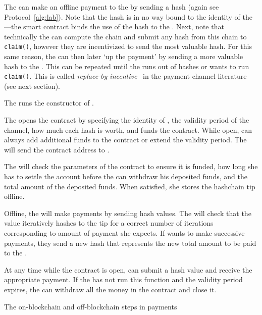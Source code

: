 The \make can make an offline payment to the \take by sending a hash (again see Protocol~\ref{alg:lab}). Note that the hash is in no way bound to the identity of the \take---the smart contract binds the use of the hash to the \take. Next, note that technically the \take can compute the chain and submit any hash from this chain to \texttt{claim()}, however they are incentivized to send the most valuable hash. For this same reason, the \make can then later `up the payment' by sending a more valuable hash to the \take. This can be repeated until the \make runs out of hashes or \take wants to run \texttt{claim()}. This is called \textit{replace-by-incentive}~\cite{MMSH16} in the payment channel literature (see next section).
\begin{Protocol*}[t!]
	
	 \begin{framed} \footnotesize
		
		\begin{compactlistn}
			\item The \make runs the constructor of \ew.
			\item The \make opens the contract by specifying the identity of \take, the validity period of the channel, how much each hash is worth, and funds the contract. While open, \make can always add additional funds to the contract or extend the validity period. The \make will send the contract address to \take. 
			\item The \take will check the parameters of the contract to ensure it is funded, how long she has to settle the account before the \make can withdraw his deposited funds, and the total amount of the deposited funds. When satisfied, she stores the hashchain tip offline.
			\item Offline, the \make will make payments by sending hash values. The \take will check that the value iteratively hashes to the tip for a correct number of iterations corresponding to amount of payment she expects. If \make wants to make successive payments, they send a new hash that represents the new total amount to be paid to the \take.
			\item At any time while the contract is open, \take can submit a hash value and receive the appropriate payment. If the \take has not run this function and the validity period expires, the \make can withdraw all the money in the contract and close it.
		\end{compactlistn}
		\normalsize \end{framed}
	\caption{The on-blockchain and off-blockchain steps in \ew payments~\label{alg:lab}}
	
\end{Protocol*}


